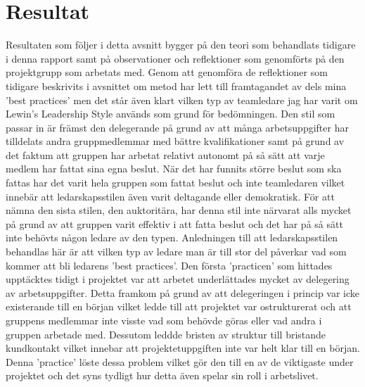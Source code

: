 \section{Resultat}
Resultaten som följer i detta avsnitt bygger på den teori som behandlats tidigare i denna rapport samt på observationer och reflektioner som genomförts på den projektgrupp som arbetats med. Genom att genomföra de reflektioner som tidigare beskrivits i avsnittet om metod har lett till framtagandet av dels mina 'best practices' men det står även klart vilken typ av teamledare jag har varit om Lewin's Leadership Style används som grund för bedömningen. Den stil som passar in är främst den delegerande på grund av att många arbetsuppgifter har tilldelats andra gruppmedlemmar med bättre kvalifikationer samt på grund av det faktum att gruppen har arbetat relativt autonomt på så sätt att varje medlem har fattat sina egna beslut. När det har funnits större beslut som ska fattas har det varit hela gruppen som fattat beslut och inte teamledaren vilket innebär att ledarskapsstilen även varit deltagande eller demokratisk. För att nämna den sista stilen, den auktoritära, har denna stil inte närvarat alls mycket på grund av att gruppen varit effektiv i att fatta beslut och det har på så sätt inte behövts någon ledare av den typen.
\newline \newline
Anledningen till att ledarskapsstilen behandlas här är att vilken typ av ledare man är till stor del påverkar vad som kommer att bli ledarens 'best practices'. Den första 'practicen' som hittades upptäcktes tidigt i projektet var att arbetet underlättades mycket av delegering av arbetsuppgifter. Detta framkom på grund av att delegeringen i princip var icke existerande till en början vilket ledde till att projektet var ostrukturerat och att gruppens medlemmar inte visste vad som behövde göras eller vad andra i gruppen arbetade med. Dessutom leddde bristen av struktur till bristande kundkontakt vilket innebar att projektetuppgiften inte var helt klar till en början. Denna 'practice' löste dessa problem vilket gör den till en av de viktigaste under projektet och det syns tydligt hur detta även spelar sin roll i arbetslivet. 
\newline \newline

